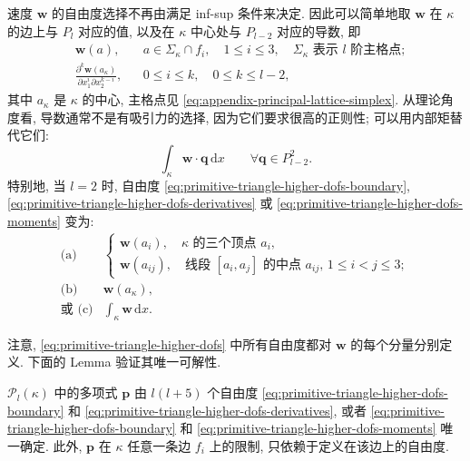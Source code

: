 速度 $\mathbf w$ 的自由度选择不再由满足 inf-sup 条件来决定.
因此可以简单地取 $\mathbf w$ 在 $\kappa$ 的边上与 $P_l$ 对应的值,
以及在 $\kappa$ 中心处与 $P_{l-2}$ 对应的导数, 即
\begin{subequations}\label{eq:primitive-triangle-higher-dofs}
\begin{align}
&\mathbf w(a),
&&a\in\Sigma_\kappa\cap f_i,\quad1\leq i\leq3,
\quad\Sigma_\kappa\text{ 表示 $l$ 阶主格点};
\label{eq:primitive-triangle-higher-dofs-boundary}\\
&\frac{\partial^k\mathbf w(a_\kappa)}
{\partial x_1^i\partial x_2^{k-i}},
&&0\leq i\leq k,\quad0\leq k\leq l-2,
\label{eq:primitive-triangle-higher-dofs-derivatives}
\end{align}
\end{subequations}
其中 $a_\kappa$ 是 $\kappa$ 的中心, 主格点见
\eqref{eq:appendix-principal-lattice-simplex}. 从理论角度看,
导数通常不是有吸引力的选择, 因为它们要求很高的正则性;
可以用内部矩替代它们:
\begin{equation*}\tag{2.19c}\label{eq:primitive-triangle-higher-dofs-moments}
\int_\kappa\mathbf w\cdot\mathbf q\,\mathrm dx
\qquad\forall\mathbf q\in P_{l-2}^2.
\end{equation*}
特别地, 当 $l=2$ 时, 自由度
\eqref{eq:primitive-triangle-higher-dofs-boundary},
\eqref{eq:primitive-triangle-higher-dofs-derivatives} 或
\eqref{eq:primitive-triangle-higher-dofs-moments} 变为:
\[
\begin{array}{ll}
\text{(a)}&
\left\{
\begin{array}{l}
\mathbf w(a_i),\quad\text{$\kappa$ 的三个顶点 }a_i,\\
\mathbf w(a_{ij}),\quad
\text{线段 $[a_i,a_j]$ 的中点 $a_{ij}$, }1\leq i<j\leq3;
\end{array}\right.\\[8pt]
\text{(b)}&\mathbf w(a_\kappa),\\[4pt]
\text{或 (c)}&\displaystyle\int_\kappa\mathbf w\,\mathrm dx.
\end{array}
\]

注意, \eqref{eq:primitive-triangle-higher-dofs} 中所有自由度都对
$\mathbf w$ 的每个分量分别定义. 下面的 Lemma 验证其唯一可解性.

\setcounter{statement}{2}
\begin{Lemma}\label{lem:primitive-triangle-higher-unisolvence}
$\mathcal{P}_l(\kappa)$ 中的多项式 $\mathbf p$ 由
$l(l+5)$ 个自由度
\eqref{eq:primitive-triangle-higher-dofs-boundary} 和
\eqref{eq:primitive-triangle-higher-dofs-derivatives}, 或者
\eqref{eq:primitive-triangle-higher-dofs-boundary} 和
\eqref{eq:primitive-triangle-higher-dofs-moments} 唯一确定.
此外, $\mathbf p$ 在 $\kappa$ 任意一条边 $f_i$ 上的限制,
只依赖于定义在该边上的自由度.
\end{Lemma}

